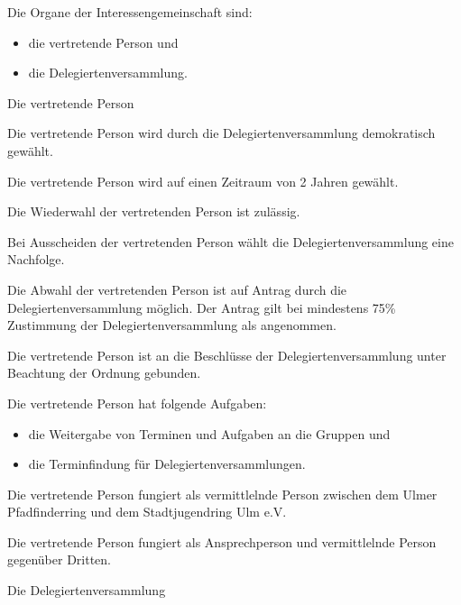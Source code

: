 \begin{legal}
\begin{legal}
            \item Die Organe der Interessengemeinschaft sind:
                \begin{itemize}
                    \item die vertretende Person und
                    \item die Delegiertenversammlung.
                \end{itemize}
        \end{legal}
    \item Die vertretende Person
        \begin{legal}
            \item Die vertretende Person wird durch die Delegiertenversammlung 
                  demokratisch gewählt.
            \item Die vertretende Person wird auf einen Zeitraum von 2 Jahren gewählt.
            \item Die Wiederwahl der vertretenden Person ist zulässig.
            \item Bei Ausscheiden der vertretenden Person wählt die Delegiertenversammlung 
                  eine Nachfolge.
            \item Die Abwahl der vertretenden Person ist auf Antrag durch die 
                  Delegiertenversammlung möglich. Der Antrag gilt bei mindestens 75\% Zustimmung der
                  Delegiertenversammlung als angenommen.
            \item Die vertretende Person ist an die Beschlüsse der Delegiertenversammlung 
                  unter Beachtung der Ordnung gebunden.
            \item Die vertretende Person hat folgende Aufgaben:
                  \begin{itemize}
                        \item die Weitergabe von Terminen und Aufgaben an die Gruppen und
                        \item die Terminfindung für Delegiertenversammlungen.
                  \end{itemize}
            \item Die vertretende Person fungiert als vermittlelnde Person zwischen dem 
                  Ulmer Pfadfinderring und dem Stadtjugendring Ulm e.V.
            \item Die vertretende Person fungiert als Ansprechperson und vermittlelnde 
                  Person gegenüber Dritten.
        \end{legal}
    \newpage
    \item Die Delegiertenversammlung

\end{legal}

